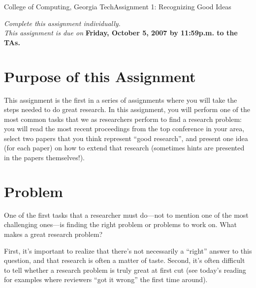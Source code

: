\documentclass[11pt]{article}
\begin{document}


{College of Computing, Georgia Tech}{Assignment 1: Recognizing Good Ideas}

{\em Complete this assignment individually. \\  This
  assignment is due on} {\bf Friday, October 5, 2007 by 11:59p.m. to
  the TAs.}

\section{Purpose of this Assignment}

This assignment is the first in a series of assignments where you will
take the steps needed to do great research.  In this assignment, you
will perform one of the most common tasks that we as researchers perform
to find a research problem: you will read the most recent proceedings
from the top conference in your area, select two papers that you think
represent ``good research'', and present one idea (for each paper) on
how to extend that research (sometimes hints are presented in the papers
themselves!).


\section{Problem}


One of the first tasks that a researcher must do---not to mention one of
the most challenging ones---is finding the right problem or problems to
work on.  What makes a great research problem?  

First, it's important to realize that there's not necessarily a
``right'' answer to this question, and that research is often a matter
of taste.  Second, it's often difficult to tell whether a research
problem is truly great at first cut (see today's reading for examples
where reviewers ``got it wrong'' the first time around).
\end{document}
